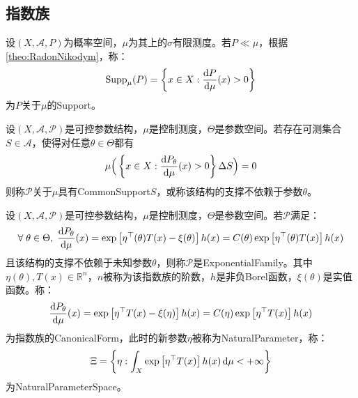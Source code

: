 \subsection{指数族}
\begin{definition}
	设$(X,\mathscr{A},P)$为概率空间，$\mu$为其上的$\sigma$有限测度。若$P\ll\mu$，根据\cref{theo:RadonNikodym}，称：
	\begin{equation*}
		\operatorname{Supp}_{\mu}(P)=\left\{x\in X:\frac{\mathop{}\!\mathrm{d} P}{\mathop{}\!\mathrm{d}\mu}(x)>0\right\}
	\end{equation*}
	为$P$关于$\mu$的\gls{Support}。
\end{definition}
\begin{definition}
	设$(X,\mathscr{A},\mathscr{P})$是可控参数结构，$\mu$是控制测度，$\Theta$是参数空间。若存在可测集合$S\in\mathscr{A}$，使得对任意$\theta\in\Theta$都有
	\begin{equation*}
		\mu\Big(\left\{x\in X:\frac{\mathop{}\!\mathrm{d} P_{\theta}}{\mathop{}\!\mathrm{d}\mu}(x)>0\right\}\Delta S\Big)=0
	\end{equation*}
	则称$\mathscr{P}$关于$\mu$具有\gls{CommonSupport}$S$，或称该结构的支撑不依赖于参数$\theta$。
\end{definition}
\begin{definition}
	设$(X,\mathscr{A},\mathscr{P})$是可控参数结构，$\mu$是控制测度，$\Theta$是参数空间。若$\mathscr{P}$满足：
	\begin{equation*}
		\forall\;\theta\in\Theta,\;\frac{\mathop{}\!\mathrm{d} P_{\theta}}{\mathop{}\!\mathrm{d}\mu}(x)=\exp\left[\eta^{\top}(\theta)T(x)-\xi(\theta)\right]h(x)=C(\theta)\exp\left[\eta^{\top}(\theta)T(x)\right]h(x)
	\end{equation*}
	且该结构的支撑不依赖于未知参数$\theta$，则称$\mathscr{P}$是\gls{ExponentialFamily}。其中$\eta(\theta),T(x)\in\mathbb{R}^{n}$，$n$被称为该指数族的阶数，$h$是非负Borel函数，$\xi(\theta)$是实值函数。称：
	\begin{equation*}
		\frac{\mathop{}\!\mathrm{d} P_{\theta}}{\mathop{}\!\mathrm{d}\mu}(x)=\exp\left[\eta^{\top}T(x)-\xi(\eta)\right]h(x)=C(\eta)\exp\left[\eta^{\top}T(x)\right]h(x)
	\end{equation*}
	为指数族的\gls{CanonicalForm}，此时的新参数$\eta$被称为\gls{NaturalParameter}，称：
	\begin{equation*}
		\Xi=\left\{\eta:\int_{X}\exp\left[\eta^{\top}T(x)\right]h(x)\mathop{}\!\mathrm{d}\mu<+\infty\right\}
	\end{equation*}
	为\gls{NaturalParameterSpace}。
\end{definition}
